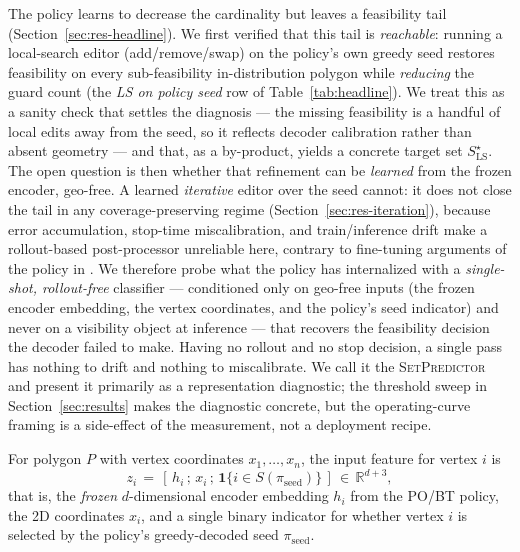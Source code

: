 \documentclass[preprint,10pt]{elsarticle}
\newcommand{\SetPredictor}{\textup{\textsc{SetPredictor}}}
\begin{document}
The policy learns to decrease the cardinality but leaves a feasibility tail (Section~\ref{sec:res-headline}). We first verified that this tail is \emph{reachable}: running a local-search editor (add/remove/swap) on the policy's own greedy seed restores feasibility on every sub-feasibility in-distribution polygon while \emph{reducing} the guard count (the \emph{LS on policy seed} row of Table~\ref{tab:headline}). We treat this as a sanity check that settles the diagnosis --- the missing feasibility is a handful of local edits away from the seed, so it reflects decoder calibration rather than absent geometry --- and that, as a by-product, yields a concrete target set $S^\star_{\mathrm{LS}}$. The open question is then whether that refinement can be \emph{learned} from the frozen encoder, geo-free. A learned \emph{iterative} editor over the seed cannot: it does not close the tail in any coverage-preserving regime (Section~\ref{sec:res-iteration}), because error accumulation, stop-time miscalibration, and train/inference drift make a rollout-based post-processor unreliable here, contrary to fine-tuning arguments of the policy in \cite{Pan2025PO}. We therefore probe what the policy has internalized with a \emph{single-shot, rollout-free} classifier --- conditioned only on geo-free inputs (the frozen encoder embedding, the vertex coordinates, and the policy's seed indicator) and never on a visibility object at inference --- that recovers the feasibility decision the decoder failed to make. Having no rollout and no stop decision, a single pass has nothing to drift and nothing to miscalibrate. We call it the \SetPredictor{} and present it primarily as a representation diagnostic; the threshold sweep in Section~\ref{sec:results} makes the diagnostic concrete, but the operating-curve framing is a side-effect of the measurement, not a deployment recipe.

For polygon $P$ with vertex coordinates $x_1, \dots, x_n$, the input feature for vertex $i$ is
\begin{equation}
z_i \,=\, [\, h_i \,;\, x_i \,;\, \mathbf{1}\{i \in S(\pi_{\mathrm{seed}})\} \,] \,\in\, \mathbb{R}^{d+3},
\label{eq:setpred-feat}
\end{equation}
that is, the \emph{frozen} $d$-dimensional encoder embedding $h_i$ from the PO/BT policy, the 2D coordinates $x_i$, and a single binary indicator for whether vertex $i$ is selected by the policy's greedy-decoded seed $\pi_{\mathrm{seed}}$. 
\end{document}
